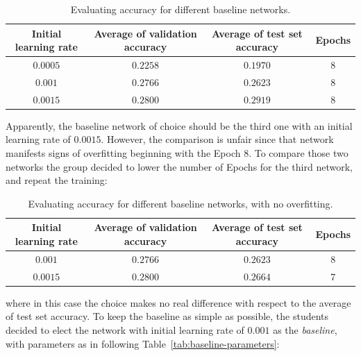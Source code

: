 \documentclass[a4paper, 11pt]{article} %
\begin{document}
\bigskip

\begin{table}[ht]
\centering
\begin{tabular}{|c|c|c|c|}
\hline 
\textbf{Initial learning rate} & \textbf{Average of validation accuracy} & \textbf{Average of test set accuracy} & \textbf{Epochs} \\
\hline \hline 
$0.0005$ & $0.2258$ & $0.1970$ & $8$ \\
\hline
$0.001$ & $0.2766$ & $0.2623$ & $8$ \\
\hline 
$0.0015$ & $0.2800$ & $0.2919$ & $8$ \\
\hline
\end{tabular}
\caption{Evaluating accuracy for different baseline networks.}\label{tab:baseline-accuracy}
\end{table}
\bigskip

Apparently, the baseline network of choice should be the third one with an initial learning rate of $0.0015$. However, the comparison is unfair since that network manifests signs of overfitting beginning with the Epoch $8$. To compare those two networks the group decided to lower the number of Epochs for the third network, and repeat the training:

\bigskip

\begin{table}[ht]
\centering
\begin{tabular}{|c|c|c|c|}
\hline 
\textbf{Initial learning rate} & \textbf{Average of validation accuracy} & \textbf{Average of test set accuracy} & \textbf{Epochs} \\
\hline \hline 
$0.001$ & $0.2766$ & $0.2623$ & $8$\\
\hline 
$0.0015$ & $0.2800$ & $0.2664$ & $7$\\
\hline
\end{tabular}
\caption{Evaluating accuracy for different baseline networks, with no overfitting.}\label{tab:baseline-accuracy-no-overfitting}
\end{table}
\bigskip

where in this case the choice makes no real difference with respect to the average of test set accuracy. To keep the baseline as simple as possible, the students decided to elect the network with initial learning rate of $0.001$ as the \emph{baseline}, with parameters as in following Table~\ref{tab:baseline-parameters}:
\end{document}
